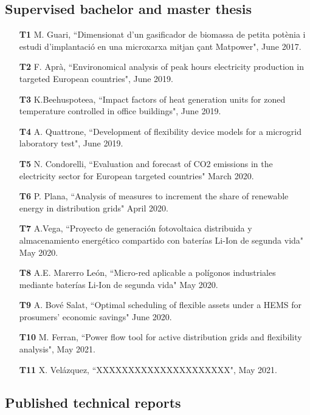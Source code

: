 \subsection*{Supervised bachelor and master thesis}

\begin{itemize}
	\item [\textbf{T1}] M. Guari, ``Dimensionat d'un gasificador de biomassa de petita pot\`{e}nia i estudi d'implantaci\'{o} en una microxarxa mitjan \c{c}ant Matpower", June 2017.
	\item [\textbf{T2}] F. Apr\`{a}, ``Environomical analysis of peak hours electricity production in targeted European countries", June 2019.
	\item [\textbf{T3}] K.Beehuspoteea,  ``Impact factors of heat generation units for zoned temperature controlled in office buildings", June 2019.
	\item [\textbf{T4}] A. Quattrone, ``Development of flexibility device models for a microgrid laboratory test", June 2019. 
	\item [\textbf{T5}] N. Condorelli, ``Evaluation and forecast of CO2 emissions in the
electricity sector for European targeted countries" March 2020.
	\item [\textbf{T6}] P. Plana, ``Analysis of measures to increment the share of renewable energy in distribution grids" April 2020.
	\item [\textbf{T7}] A.Vega, ``Proyecto de generaci\'{o}n fotovoltaica distribuida y almacenamiento energ\'{e}tico compartido con bater\'{i}as Li-Ion de segunda vida" May 2020.
	\item [\textbf{T8}] A.E. Marerro Le\'{o}n, ``Micro-red aplicable a pol\'{i}gonos industriales mediante bater\'{i}as Li-Ion de segunda vida" May 2020.
	\item [\textbf{T9}] A. Bov\'{e} Salat, ``Optimal scheduling of flexible assets under a HEMS for prosumers' economic savings" June 2020. 
	\item [\textbf{T10}] M. Ferran, ``Power flow tool for active distribution grids and flexibility analysis", May 2021. 
	\item [\textbf{T11}] X. Vel\'{a}zquez, ``XXXXXXXXXXXXXXXXXXXXX", May 2021. 
	 
\end{itemize}

\subsection*{Published technical reports}

